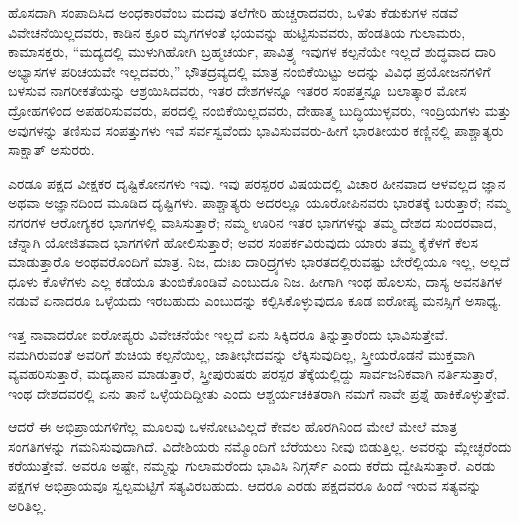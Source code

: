 \vskip 4pt

ಹೊಸದಾಗಿ ಸಂಪಾದಿಸಿದ ಅಂಧಕಾರವೆಂಬ ಮದವು ತಲೆಗೇರಿ ಹುಚ್ಚರಾದವರು, ಒಳಿತು ಕೆಡುಕುಗಳ ನಡವೆ ವಿವೇಚನೆಯಿಲ್ಲದವರು, ಕಾಡಿನ ಕ್ರೂರ ಮೃಗಗಳಂತೆ ಭಯವನ್ನು ಹುಟ್ಟಿಸುವವರು, ಹೆಂಡತಿಯ ಗುಲಾಮರು, ಕಾಮಾಸಕ್ತರು, “ಮದ್ಯದಲ್ಲಿ ಮುಳುಗಿಹೋಗಿ ಬ್ರಹ್ಮಚರ್ಯ, ಪಾವಿತ್ರ್ಯ ಇವುಗಳ ಕಲ್ಪನೆಯೇ ಇಲ್ಲದೆ ಶುದ್ಧವಾದ ದಾರಿ ಅಭ್ಯಾಸಗಳ ಪರಿಚಯವೇ ಇಲ್ಲದವರು,” ಭೌತದ್ರವ್ಯದಲ್ಲಿ ಮಾತ್ರ ನಂಬಿಕೆಯಿಟ್ಟು ಅದನ್ನು ವಿವಿಧ ಪ್ರಯೋಜನಗಳಿಗೆ ಬಳಸುವ ನಾಗರೀಕತೆಯನ್ನು ಆಶ್ರಯಿಸಿದವರು, ಇತರ ದೇಶಗಳನ್ನೂ ಇತರರ ಸಂಪತ್ತನ್ನೂ ಬಲಾತ್ಕಾರ ಮೋಸ ದ್ರೋಹಗಳಿಂದ ಅಪಹರಿಸುವವರು, ಪರದಲ್ಲಿ ನಂಬಿಕೆಯಿಲ್ಲದವರು, ದೇಹಾತ್ಮ ಬುದ್ಧಿಯುಳ್ಳವರು, ಇಂದ್ರಿಯಗಳು ಮತ್ತು ಅವುಗಳನ್ನು ತಣಿಸುವ ಸಂಪತ್ತುಗಳು ಇವೆ ಸರ್ವಸ್ವವೆಂದು ಭಾವಿಸುವವರು-ಹೀಗೆ ಭಾರತೀಯರ ಕಣ್ಣಿನಲ್ಲಿ ಪಾಶ್ಚಾತ್ಯರು ಸಾಕ್ಷಾತ್​ ಅಸುರರು.

\vskip 4pt

ಎರಡೂ ಪಕ್ಷದ ವೀಕ್ಷಕರ ದೃಷ್ಟಿಕೋನಗಳು ಇವು. ಇವು ಪರಸ್ಪರರ ವಿಷಯದಲ್ಲಿ ವಿಚಾರ ಹೀನವಾದ ಆಳವಲ್ಲದ ಜ್ಞಾನ ಅಥವಾ ಅಜ್ಞಾನದಿಂದ ಮೂಡಿದ ದೃಷ್ಟಿಗಳು. ಪಾಶ್ಚಾತ್ಯರು ಅದರಲ್ಲೂ ಯೂರೋಪಿನವರು ಭಾರತಕ್ಕೆ ಬರುತ್ತಾರೆ; ನಮ್ಮ ನಗರಗಳ ಆರೋಗ್ಯಕರ ಭಾಗಗಳಲ್ಲಿ ವಾಸಿಸುತ್ತಾರೆ; ನಮ್ಮ ಊರಿನ ಇತರ ಭಾಗಗಳನ್ನು ತಮ್ಮ ದೇಶದ ಸುಂದರವಾದ, ಚೆನ್ನಾಗಿ ಯೋಜಿತವಾದ ಭಾಗಗಳಿಗೆ ಹೋಲಿಸುತ್ತಾರೆ; ಅವರ ಸಂಪರ್ಕವಿರುವುದು ಯಾರು ತಮ್ಮ ಕೈಕೆಳಗೆ ಕೆಲಸ ಮಾಡುತ್ತಾರೊ ಅಂಥವರೊಂದಿಗೆ ಮಾತ್ರ. ನಿಜ, ದುಃಖ ದಾರಿದ್ರ್ಯಗಳು ಭಾರತದಲ್ಲಿರುವಷ್ಟು ಬೇರೆಲ್ಲಿಯೂ ಇಲ್ಲ, ಅಲ್ಲದೆ ಧೂಳು ಕೊಳೆಗಳು ಎಲ್ಲ ಕಡೆಯೂ ತುಂಬಿಕೊಂಡಿವೆ ಎಂಬುದೂ ನಿಜ. ಹೀಗಾಗಿ ಇಂಥ ಹೊಲಸು, ದಾಸ್ಯ ಅವನತಿಗಳ ನಡುವೆ ಏನಾದರೂ ಒಳ್ಳೆಯದು ಇರಬಹುದು ಎಂಬುದನ್ನು ಕಲ್ಪಿಸಿಕೊಳ್ಳುವುದೂ ಕೂಡ ಐರೋಪ್ಯ ಮನಸ್ಸಿಗೆ ಅಸಾಧ್ಯ.

ಇತ್ತ ನಾವಾದರೋ ಐರೋಪ್ಯರು ವಿವೇಚನೆಯೇ ಇಲ್ಲದೆ ಏನು ಸಿಕ್ಕಿದರೂ ತಿನ್ನುತ್ತಾರೆಂದು ಭಾವಿಸುತ್ತೇವೆ. ನಮಗಿರುವಂತೆ ಅವರಿಗೆ ಶುಚಿಯ ಕಲ್ಪನೆಯಿಲ್ಲ, ಜಾತೀಭೇದವನ್ನು ಲೆಕ್ಕಿಸುವುದಿಲ್ಲ, ಸ್ತ್ರೀಯರೊಡನೆ ಮುಕ್ತವಾಗಿ ವ್ಯವಹರಿಸುತ್ತಾರೆ, ಮದ್ಯಪಾನ ಮಾಡುತ್ತಾರೆ, ಸ್ತ್ರೀಪುರುಷರು ಪರಸ್ಪರ ತೆಕ್ಕೆಯಲ್ಲಿದ್ದು ಸಾರ್ವಜನಿಕವಾಗಿ ನರ್ತಿಸುತ್ತಾರೆ, ಇಂಥ ದೇಶದವರಲ್ಲಿ ಏನು ತಾನೆ ಒಳ್ಳೆಯದಿದ್ದೀತು ಎಂದು ಆಶ್ಚರ್ಯಚಕಿತರಾಗಿ ನಮಗೆ ನಾವೇ ಪ್ರಶ್ನೆ ಹಾಕಿಕೊಳ್ಳುತ್ತೇವೆ.

ಆದರೆ ಈ ಅಭಿಪ್ರಾಯಗಳಿಗೆಲ್ಲ ಮೂಲವು ಒಳನೋಟವಿಲ್ಲದೆ ಕೇವಲ ಹೊರಗಿನಿಂದ ಮೇಲೆ ಮೇಲೆ ಮಾತ್ರ ಸಂಗತಿಗಳನ್ನು ಗಮನಿಸುವುದಾಗಿದೆ. ವಿದೇಶಿಯರು ನಮ್ಮೊಂದಿಗೆ ಬೆರೆಯಲು ನೀವು ಬಿಡುತ್ತಿಲ್ಲ. ಅವರನ್ನು ಮ್ಲೇಚ್ಛರೆಂದು ಕರೆಯುತ್ತೇವೆ. ಅವರೂ ಅಷ್ಟೇ, ನಮ್ಮನ್ನು ಗುಲಾಮರೆಂದು ಭಾವಿಸಿ ನಿಗ್ಗರ್ಸ್​ ಎಂದು ಕರೆದು ದ್ವೇಷಿಸುತ್ತಾರೆ. ಎರಡು ಪಕ್ಷಗಳ ಅಭಿಪ್ರಾಯವೂ ಸ್ವಲ್ಪಮಟ್ಟಿಗೆ ಸತ್ಯವಿರಬಹುದು. ಆದರೂ ಎರಡು ಪಕ್ಷದವರೂ ಹಿಂದೆ ಇರುವ ಸತ್ಯವನ್ನು ಅರಿತಿಲ್ಲ.

